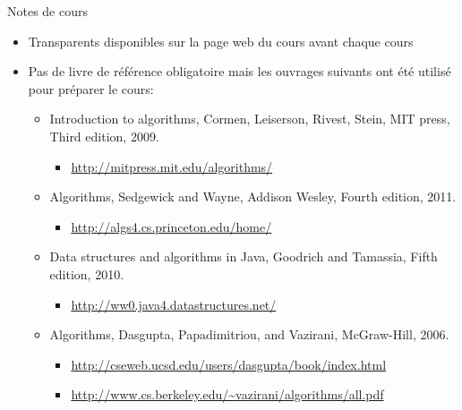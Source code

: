 \begin{frame}{Notes de cours}
\begin{itemize}
\item Transparents disponibles sur la page web du cours avant chaque cours
\item Pas de livre de référence obligatoire mais les ouvrages suivants ont été utilisé pour préparer le cours:
{\small
\begin{itemize}
\item Introduction to algorithms, Cormen, Leiserson, Rivest, Stein, MIT press, Third edition, 2009.
\begin{itemize}
\item \url{http://mitpress.mit.edu/algorithms/}
\end{itemize}
\item Algorithms, Sedgewick and Wayne, Addison Wesley, Fourth edition, 2011.
\begin{itemize}
\item \url{http://algs4.cs.princeton.edu/home/}
\end{itemize}
\item Data structures and algorithms in Java, Goodrich and Tamassia, Fifth edition, 2010.
\begin{itemize}
\item \url{http://ww0.java4.datastructures.net/}
\end{itemize}
\item Algorithms, Dasgupta, Papadimitriou, and Vazirani, McGraw-Hill, 2006.
\begin{itemize}
\item \url{http://cseweb.ucsd.edu/users/dasgupta/book/index.html}
\item \url{http://www.cs.berkeley.edu/~vazirani/algorithms/all.pdf}
\end{itemize}
\end{itemize}
}
\end{itemize}
\end{frame}

